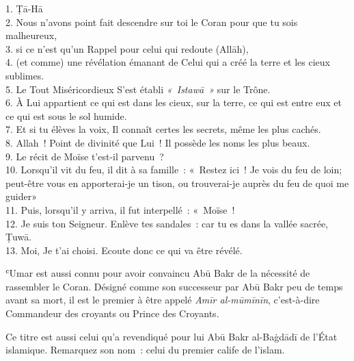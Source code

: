 
1. Ṭā-Hā\\
{2.}
Nous n'avons point fait descendre sur toi le Coran pour que tu sois
malheureux,\\
{3.}
si ce n'est qu'un Rappel pour celui qui redoute (Allāh),\\
{4.}
(et comme) une révélation émanant de Celui qui a créé la terre et les
cieux sublimes.\\
{5.}
Le Tout Miséricordieux S'est établi \emph{«~Istawā~»} sur le Trône.\\
{6.}
À Lui appartient ce qui est dans les cieux, sur la terre, ce qui est
entre eux et ce qui est sous le sol humide.\\
{7.}
Et si tu élèves la voix, Il connaît certes les secrets, même les plus
cachés.\\
{8.}
Allah~! Point de divinité que Lui~! Il possède les noms les plus
beaux.\\
{9.}
Le récit de Moïse t'est-il parvenu~?\\
{10.}
Lorsqu'il vit du feu, il dit à sa famille~: «~Restez ici~! Je vois du
feu de loin; peut-être vous en apporterai-je un tison, ou trouverai-je
auprès du feu de quoi me
guider»\\
{11.}
Puis, lorsqu'il y arriva, il fut interpellé~: «~Moïse~!\\
{12.}
Je suis ton Seigneur. Enlève tes sandales~: car tu es dans la vallée
sacrée, Ṭuwā.\\
{13.}
Moi, Je t'ai choisi. Ecoute donc ce qui va être révélé.

ʿUmar est aussi connu pour avoir convaincu Abū Bakr de la nécessité de
rassembler le Coran. Désigné comme son successeur par Abū Bakr peu de
temps avant sa mort, il est le premier à être appelé \emph{Amīr
al-mūmīnīn}, c'est-à-dire Commandeur des croyants ou Prince des
Croyants.



Ce titre est aussi celui qu'a revendiqué pour lui Abū Bakr al-Baġdādī de
l'État islamique. Remarquez son nom~: celui du premier calife de
l'islam.

